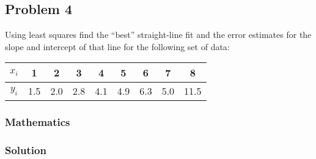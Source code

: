 \subsection{Problem 4}%
\label{sec:problem_4}
Using least squares find the ``best'' straight-line fit and the error estimates for the
slope and intercept of that line for the following set of data:
\begin{center}
  \begin{tabular}{|c|c|c|c|c|c|c|c|c|}
    \hline
    $x_i$ & 1 & 2 & 3 & 4 & 5 & 6 & 7 & 8 \\
    \hline
    $y_i$ & 1.5 & 2.0 & 2.8 & 4.1 & 4.9 & 6.3 & 5.0 & 11.5 \\
    \hline
  \end{tabular}
\end{center}
\subsubsection*{Mathematics}
\subsubsection*{Solution}
